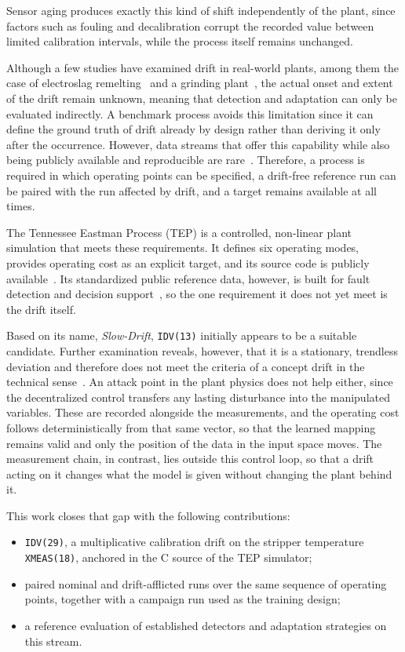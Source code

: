Sensor aging produces exactly this kind of shift independently of the plant, since factors such as fouling and decalibration corrupt the recorded value between limited calibration intervals, while the process itself remains unchanged. \par
Although a few studies have examined drift in real-world plants, among them the case of electroslag remelting~\cite{bayram.2022b} and a grinding plant~\cite{marijan.2025}, the actual onset and extent of the drift remain unknown, meaning that detection and adaptation can only be evaluated indirectly. A benchmark process avoids this limitation since it can define the ground truth of drift already by design rather than deriving it only after the occurrence. However, data streams that offer this capability while also being publicly available and reproducible are rare~\cite{souza.2020}. Therefore, a process is required in which operating points can be specified, a drift-free reference run can be paired with the run affected by drift, and a target remains available at all times. \par
The Tennessee Eastman Process (TEP) is a controlled, non-linear plant simulation that meets these requirements. It defines six operating modes, provides operating cost as an explicit target, and its source code is publicly available~\cite{downs.1993, ricker.1995, ricker.1996, bathelt.2015, reinartz.2022}. Its standardized public reference data, however, is built for fault detection and decision support~\cite{reinartz.2021}, so the one requirement it does not yet meet is the drift itself. \par
Based on its name, \emph{Slow-Drift}, \texttt{IDV(13)} initially appears to be a suitable candidate. Further examination reveals, however, that it is a stationary, trendless deviation and therefore does not meet the criteria of a concept drift in the technical sense~\cite{downs.1993}.
An attack point in the plant physics does not help either, since the decentralized control transfers any lasting disturbance into the manipulated variables. These are recorded alongside the measurements, and the operating cost follows deterministically from that same vector, so that the learned mapping remains valid and only the position of the data in the input space moves. The measurement chain, in contrast, lies outside this control loop, so that a drift acting on it changes what the model is given without changing the plant behind it. \par
This work closes that gap with the following contributions:
%
\begin{itemize}
\item[(i)] \texttt{IDV(29)}, a multiplicative calibration drift on the stripper temperature \texttt{XMEAS(18)}, anchored in the C source of the TEP simulator;
\item[(ii)] paired nominal and drift-afflicted runs over the same sequence of operating points, together with a campaign run used as the training design;
\item[(iii)] a reference evaluation of established detectors and adaptation strategies on this stream.
\end{itemize}
